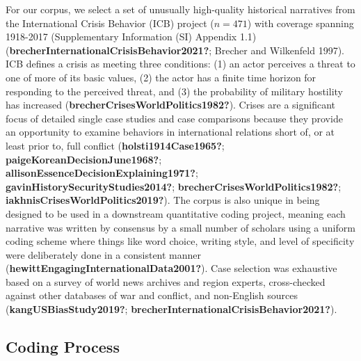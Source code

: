 \documentclass{article}
\begin{document}
For our corpus, we select a set of unusually high-quality historical
narratives from the International Crisis Behavior (ICB) project
(\(n=471\)) with coverage spanning 1918-2017 (Supplementary Information
(SI) Appendix 1.1)(\textbf{brecherInternationalCrisisBehavior2021?};
Brecher and Wilkenfeld 1997). ICB defines a crisis as meeting three
conditions: (1) an actor perceives a threat to one of more of its basic
values, (2) the actor has a finite time horizon for responding to the
perceived threat, and (3) the probability of military hostility has
increased (\textbf{brecherCrisesWorldPolitics1982?}). Crises are a
significant focus of detailed single case studies and case comparisons
because they provide an opportunity to examine behaviors in
international relations short of, or at least prior to, full conflict
(\textbf{holsti1914Case1965?}; \textbf{paigeKoreanDecisionJune1968?};
\textbf{allisonEssenceDecisionExplaining1971?};
\textbf{gavinHistorySecurityStudies2014?};
\textbf{brecherCrisesWorldPolitics1982?};
\textbf{iakhnisCrisesWorldPolitics2019?}). The corpus is also unique in
being designed to be used in a downstream quantitative coding project,
meaning each narrative was written by consensus by a small number of
scholars using a uniform coding scheme where things like word choice,
writing style, and level of specificity were deliberately done in a
consistent manner (\textbf{hewittEngagingInternationalData2001?}). Case
selection was exhaustive based on a survey of world news archives and
region experts, cross-checked against other databases of war and
conflict, and non-English sources (\textbf{kangUSBiasStudy2019?};
\textbf{brecherInternationalCrisisBehavior2021?}).

\hypertarget{coding-process}{%
\subsection{Coding Process}\label{coding-process}}
\end{document}
